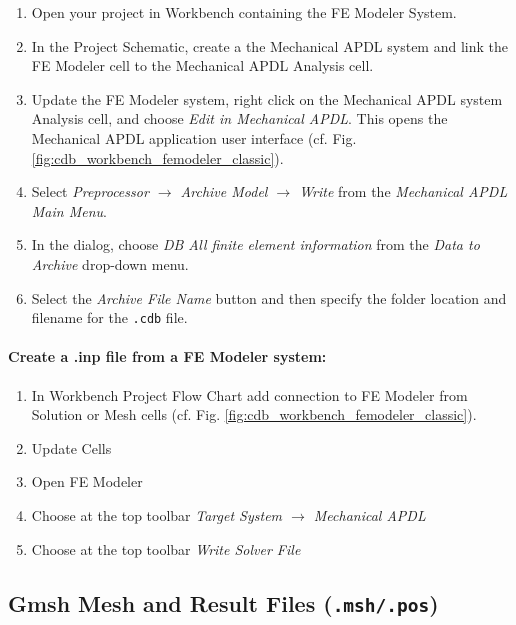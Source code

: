 \begin{enumerate}
\item Open your project in Workbench containing the FE Modeler System.

\item In the  Project Schematic, create a the Mechanical  APDL system and link
  the FE Modeler cell to the Mechanical APDL Analysis cell.

\item Update the FE Modeler system,  right click on the Mechanical APDL system
  Analysis cell,  and choose  \emph{Edit in Mechanical  APDL}. This  opens the
  Mechanical          APDL         application          user         interface
  (cf. Fig. \ref{fig:cdb_workbench_femodeler_classic}).

\item  Select  \emph{Preprocessor  $\rightarrow$ Archive  Model  $\rightarrow$
  Write} from the \emph{Mechanical APDL Main Menu}.

\item In the dialog, choose \emph{DB  All finite element information} from the
  \emph{Data to Archive} drop-down menu.

\item Select the  \emph{Archive File Name} button and then  specify the folder
  location and filename for the {\tt .cdb} file.
\end{enumerate}

\paragraph{Create a .inp file from a FE Modeler system:}

\begin{enumerate}
\item  In Workbench  Project  Flow Chart  add connection  to  FE Modeler  from
  Solution or Mesh cells (cf. Fig. \ref{fig:cdb_workbench_femodeler_classic}).
\item Update Cells
\item Open FE Modeler
\item Choose at the top  toolbar \emph{Target System $\rightarrow$ Mechanical
  APDL}
\item Choose at the top toolbar \emph{Write Solver File}
\end{enumerate}

\subsection{Gmsh Mesh and Result Files ({\tt .msh/.pos})}

